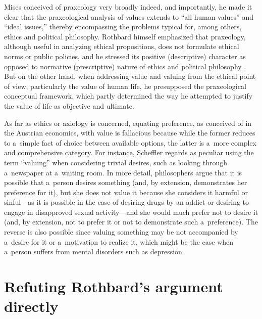 Mises conceived of praxeology very broadly indeed, and importantly, he made it clear that the praxeological analysis of values extends to ``all human values'' and ``ideal issues,'' thereby encompassing the problems typical for, among others, ethics and political philosophy. Rothbard himself emphasized that praxeology, although useful in analyzing ethical propositions, does not formulate ethical norms or public policies, and he stressed its positive (descriptive) character as opposed to normative (prescriptive) nature of ethics and political philosophy 
\parencite[see, e.g.,][p.1297ff]{}. %
 But on the other hand, when addressing value and valuing from the ethical point of view, particularly the value of human life, he presupposed the praxeological conceptual framework, which partly determined the way he attempted to justify the value of life as objective and ultimate.



As far as ethics or axiology is concerned, equating preference, as conceived of in the Austrian economics, with value is fallacious because while the former reduces to a~simple fact of choice between available options, the latter is a~more complex and comprehensive category. For instance, Scheffler 
\parencite*[][p.24]{} %
 regards as peculiar using the term ``valuing'' when considering trivial desires, such as looking through a~newspaper at a~waiting room. In more detail, philosophers argue 
\parencite[see discussion in][]{} %
 that it is possible that a~person desires something (and, by extension, demonstrates her preference for it), but she does not value it because she considers it harmful or sinful---as it is possible in the case of desiring drugs by an addict or desiring to engage in disapproved sexual activity---and she would much prefer not to desire it (and, by extension, not to prefer it or not to demonstrate such a~preference). The reverse is also possible since valuing something may be not accompanied by a~desire for it or a~motivation to realize it, which might be the case when a~person suffers from mental disorders such as depression.



\section{Refuting Rothbard's argument directly}

